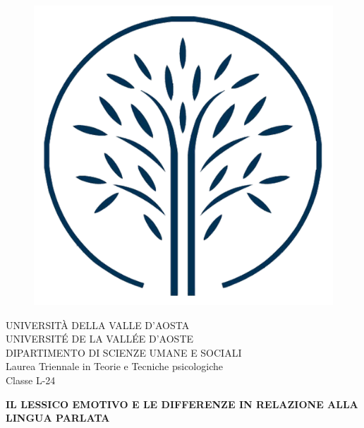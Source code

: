 
\begin{titlepage}
\begin{figure}[H]
    \centering
    \includegraphics[keepaspectratio=true,scale=0.2]{images/logo_univda.png}
\end{figure}

\begin{center}
  {\LARGE{UNIVERSITÀ DELLA VALLE D’AOSTA}}
  \vspace{3mm}
  \\{\LARGE{UNIVERSITÉ DE LA VALLÉE D’AOSTE}}
  \vspace{9mm}
  \\ {\large{DIPARTIMENTO DI SCIENZE UMANE E SOCIALI}}
  \vspace{9mm}
  \\ {\Large{Laurea Triennale in Teorie e Tecniche psicologiche}}
  \vspace{2mm}
  \\ {\large{Classe L-24}}
\end{center}

\vspace{15mm}
\begin{center}
  {\Large{\bf{IL LESSICO EMOTIVO E LE DIFFERENZE IN RELAZIONE ALLA LINGUA PARLATA}}}
\end{center}
\vspace{40mm}


\end{titlepage}

